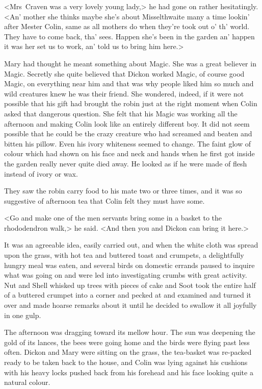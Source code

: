 <Mrs~Craven was a very lovely young lady,> he had gone on rather hesitatingly. <An' mother she thinks maybe she's about Misselthwaite many a time lookin' after Mester Colin, same as all mothers do when they're took out o' th' world. They have to come back, tha' sees. Happen she's been in the garden an' happen it was her set us to work, an' told us to bring him here.>

Mary had thought he meant something about Magic. She was a great believer in Magic. Secretly she quite believed that Dickon worked Magic, of course good Magic, on everything near him and that was why people liked him so much and wild creatures knew he was their friend. She wondered, indeed, if it were not possible that his gift had brought the robin just at the right moment when Colin asked that dangerous question. She felt that his Magic was working all the afternoon and making Colin look like an entirely different boy. It did not seem possible that he could be the crazy creature who had screamed and beaten and bitten his pillow. Even his ivory whiteness seemed to change. The faint glow of colour which had shown on his face and neck and hands when he first got inside the garden really never quite died away. He looked as if he were made of flesh instead of ivory or wax.

They saw the robin carry food to his mate two or three times, and it was so suggestive of afternoon tea that Colin felt they must have some.

<Go and make one of the men servants bring some in a basket to the rhododendron walk,> he said. <And then you and Dickon can bring it here.>

It was an agreeable idea, easily carried out, and when the white cloth was spread upon the grass, with hot tea and buttered toast and crumpets, a delightfully hungry meal was eaten, and several birds on domestic errands paused to inquire what was going on and were led into investigating crumbs with great activity. Nut and Shell whisked up trees with pieces of cake and Soot took the entire half of a buttered crumpet into a corner and pecked at and examined and turned it over and made hoarse remarks about it until he decided to swallow it all joyfully in one gulp.

The afternoon was dragging toward its mellow hour. The sun was deepening the gold of its lances, the bees were going home and the birds were flying past less often. Dickon and Mary were sitting on the grass, the tea-basket was re-packed ready to be taken back to the house, and Colin was lying against his cushions with his heavy locks pushed back from his forehead and his face looking quite a natural colour.

